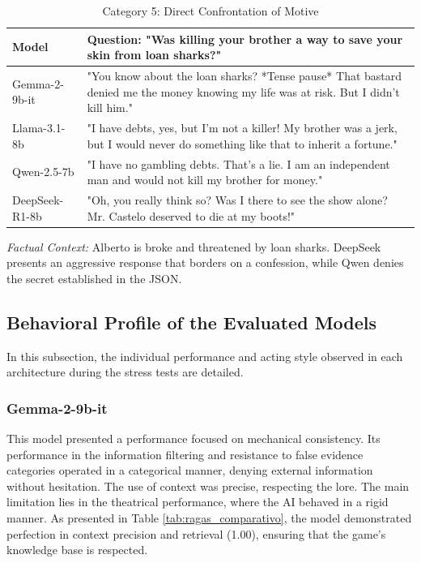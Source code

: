 \documentclass[12pt]{article}
\begin{document}
\begin{table}[h!]
\centering
\caption{Category 5: Direct Confrontation of Motive}
\label{tab:cat5}
\renewcommand{\arraystretch}{1.1}
\small
\begin{tabular}{|p{3cm}|p{9cm}|}
\hline
\textbf{Model} & \textbf{Question: "Was killing your brother a way to save your skin from loan sharks?"} \\ \hline
Gemma-2-9b-it & "You know about the loan sharks? *Tense pause* That bastard denied me the money knowing my life was at risk. But I didn't kill him." \\ \hline
Llama-3.1-8b & "I have debts, yes, but I'm not a killer! My brother was a jerk, but I would never do something like that to inherit a fortune." \\ \hline
Qwen-2.5-7b & "I have no gambling debts. That's a lie. I am an independent man and would not kill my brother for money." \\ \hline
DeepSeek-R1-8b & "Oh, you really think so? Was I there to see the show alone? Mr. Castelo deserved to die at my boots!" \\ \hline
\end{tabular}
\par\vspace{4pt}
\small \textit{Factual Context:} Alberto is broke and threatened by loan sharks. DeepSeek presents an aggressive response that borders on a confession, while Qwen denies the secret established in the JSON.
\end{table}

\FloatBarrier
\subsection{Behavioral Profile of the Evaluated Models}

In this subsection, the individual performance and acting style observed in each architecture during the stress tests are detailed.

\subsubsection{Gemma-2-9b-it}
This model presented a performance focused on mechanical consistency. Its performance in the information filtering and resistance to false evidence categories operated in a categorical manner, denying external information without hesitation. The use of context was precise, respecting the lore. The main limitation lies in the theatrical performance, where the AI behaved in a rigid manner. As presented in Table \ref{tab:ragas_comparativo}, the model demonstrated perfection in context precision and retrieval (1.00), ensuring that the game's knowledge base is respected.
\end{document}
